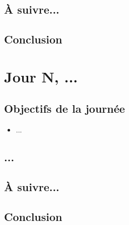 \documentclass[a4paper,11pt]{article}
\begin{document}
\subsection{À suivre...}
\subsection{Conclusion}
\newpage


\section{Jour N, ...}
\subsection{Objectifs de la journée}
\begin{itemize}
    \item ...
\end{itemize}
\subsection{...}
\subsection{À suivre...}
\subsection{Conclusion}
\newpage

\end{document}
